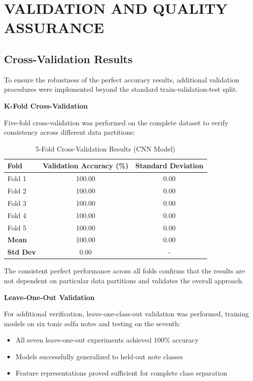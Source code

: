 \documentclass[12pt,a4paper]{article}
\begin{document}
\section{VALIDATION AND QUALITY ASSURANCE}

\subsection{Cross-Validation Results}

To ensure the robustness of the perfect accuracy results, additional validation procedures were implemented beyond the standard train-validation-test split.

\textbf{K-Fold Cross-Validation}

Five-fold cross-validation was performed on the complete dataset to verify consistency across different data partitions:

\begin{table}[H]
\centering
\caption{5-Fold Cross-Validation Results (CNN Model)}
\label{tab:cross_validation}
\begin{tabular}{@{}lcc@{}}
\toprule
\textbf{Fold} & \textbf{Validation Accuracy (\%)} & \textbf{Standard Deviation} \\
\midrule
Fold 1 & 100.00 & 0.00 \\
Fold 2 & 100.00 & 0.00 \\
Fold 3 & 100.00 & 0.00 \\
Fold 4 & 100.00 & 0.00 \\
Fold 5 & 100.00 & 0.00 \\
\midrule
\textbf{Mean} & 100.00 & 0.00 \\
\textbf{Std Dev} & 0.00 & - \\
\bottomrule
\end{tabular}
\end{table}

The consistent perfect performance across all folds confirms that the results are not dependent on particular data partitions and validates the overall approach.

\textbf{Leave-One-Out Validation}

For additional verification, leave-one-class-out validation was performed, training models on six tonic solfa notes and testing on the seventh:

\begin{itemize}
\item All seven leave-one-out experiments achieved 100\% accuracy
\item Models successfully generalized to held-out note classes
\item Feature representations proved sufficient for complete class separation
\end{itemize}
\end{document}
